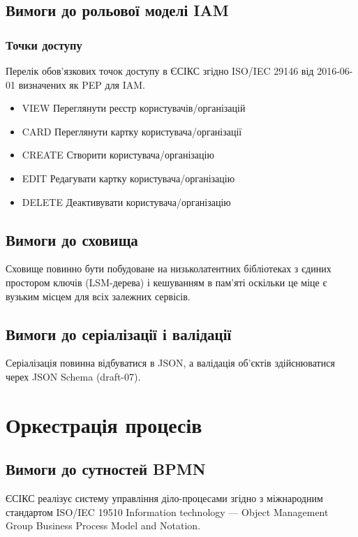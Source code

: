 \documentclass{article}
\begin{document}
\subsection{Вимоги до рольової моделі IAM}

\subsubsection{Точки доступу}
Перелік обов'язкових точок доступу в ЄСІКС згідно ISO/IEC 29146 від 2016-06-01 визначених як PEP для IAM.

\begin{itemize}
\item VIEW Переглянути реєстр користувачів/організацій
\item CARD Переглянути картку користувача/організації
\item CREATE Створити користувача/організацію
\item EDIT Редагувати картку користувача/організацію
\item DELETE Деактивувати користувача/організацію
\end{itemize}

\subsection{Вимоги до сховища}
Сховище повинно бути побудоване на низьколатентних бібліотеках з єдиних простором ключів (LSM-дерева) і кешуванням в пам'яті
оскільки це міце є вузьким місцем для всіх залежних сервісів.

\subsection{Вимоги до серіалізації і валідації}

Серіалізація повинна відбуватися в JSON, а валідація об'єктів здійснюватися черех JSON Schema (draft-07).

\newpage
\section{Оркестрація процесів}

\subsection{Вимоги до сутностей BPMN}
ЄСІКС реалізує систему управління діло-процесами згідно з міжнародним
стандартом ISO/IEC 19510 Information technology — Object Management Group Business Process Model and Notation.
\end{document}
